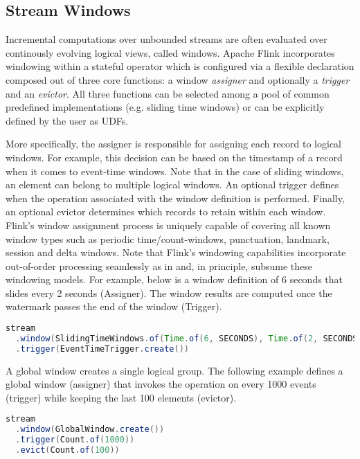 \subsection{Stream Windows}
Incremental computations over unbounded streams are often evaluated over continously evolving logical views, called windows. Apache Flink incorporates windowing within a stateful operator which is configured via a flexible declaration composed out of three core functions: a window \textit{assigner} and optionally a \textit{trigger} and an \textit{evictor}. All three functions can be selected among a pool of common predefined implementations (e.g. sliding time windows) or can be explicitly defined by the user as UDFs.

More specifically, the assigner is responsible for assigning each record to logical windows. For example, this decision can be based on the timestamp of a record when it comes to event-time windows. Note that in the case of sliding windows, an element can belong to multiple logical windows. An optional trigger defines when the operation associated with the window definition is performed. Finally, an optional evictor determines which records to retain within each window. Flink's window assignment process is uniquely capable of covering all known window types such as periodic time/count-windows, punctuation, landmark, session and delta windows. Note that Flink's windowing capabilities incorporate out-of-order processing seamlessly as in \cite{li2005semantics, akidau2015dataflow} and, in principle, subsume these windowing models. For example, below is a window definition of 6 seconds that slides every 2 seconds (Assigner). The window results are computed once the watermark passes the end of the window (Trigger).

\begin{lstlisting}[language=Java]
stream
  .window(SlidingTimeWindows.of(Time.of(6, SECONDS), Time.of(2, SECONDS))
  .trigger(EventTimeTrigger.create())
\end{lstlisting}

\noindent A global window creates a single logical group. The following example defines a global window (assigner) that invokes the operation on every 1000 events (trigger) while keeping the last 100 elements (evictor). 

\begin{lstlisting}[language=Java]
stream
  .window(GlobalWindow.create())
  .trigger(Count.of(1000))
  .evict(Count.of(100))
\end{lstlisting}

